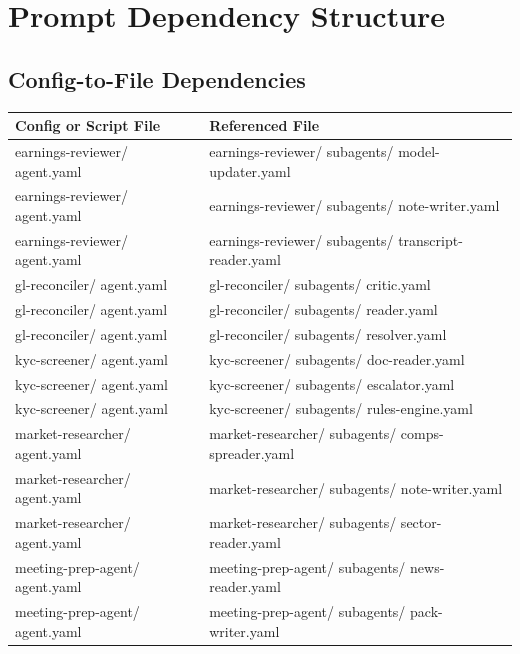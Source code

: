 \documentclass[11pt]{article}
\begin{document}
\section{Prompt Dependency Structure}

\subsection{Config-to-File Dependencies}

\begingroup
\small
\setlength{\tabcolsep}{2pt}
\begin{longtable}{>{\RaggedRight\arraybackslash\hspace{0pt}}p{}>{\RaggedRight\arraybackslash\hspace{0pt}}p{}}
\toprule
{} \textbf{Config or Script File} & \textbf{Referenced File} \\
\midrule
{} earnings-reviewer/ agent.yaml & earnings-reviewer/ subagents/ model-updater.yaml \\
{} earnings-reviewer/ agent.yaml & earnings-reviewer/ subagents/ note-writer.yaml \\
{} earnings-reviewer/ agent.yaml & earnings-reviewer/ subagents/ transcript-reader.yaml \\
{} gl-reconciler/ agent.yaml & gl-reconciler/ subagents/ critic.yaml \\
{} gl-reconciler/ agent.yaml & gl-reconciler/ subagents/ reader.yaml \\
{} gl-reconciler/ agent.yaml & gl-reconciler/ subagents/ resolver.yaml \\
{} kyc-screener/ agent.yaml & kyc-screener/ subagents/ doc-reader.yaml \\
{} kyc-screener/ agent.yaml & kyc-screener/ subagents/ escalator.yaml \\
{} kyc-screener/ agent.yaml & kyc-screener/ subagents/ rules-engine.yaml \\
{} market-researcher/ agent.yaml & market-researcher/ subagents/ comps-spreader.yaml \\
{} market-researcher/ agent.yaml & market-researcher/ subagents/ note-writer.yaml \\
{} market-researcher/ agent.yaml & market-researcher/ subagents/ sector-reader.yaml \\
{} meeting-prep-agent/ agent.yaml & meeting-prep-agent/ subagents/ news-reader.yaml \\
{} meeting-prep-agent/ agent.yaml & meeting-prep-agent/ subagents/ pack-writer.yaml \\

\end{longtable}
\end{document}
